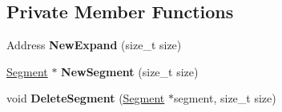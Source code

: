 \subsection*{Private Member Functions}
\begin{DoxyCompactItemize}
\item 
Address {\bfseries New\+Expand} (size\+\_\+t size)\hypertarget{classv8_1_1internal_1_1_zone_ac552c31c7a8cf5807ae9a3843d78f207}{}\label{classv8_1_1internal_1_1_zone_ac552c31c7a8cf5807ae9a3843d78f207}

\item 
\hyperlink{classv8_1_1internal_1_1_segment}{Segment} $\ast$ {\bfseries New\+Segment} (size\+\_\+t size)\hypertarget{classv8_1_1internal_1_1_zone_ad063ab9691aa305ae4645c9dec62a547}{}\label{classv8_1_1internal_1_1_zone_ad063ab9691aa305ae4645c9dec62a547}

\item 
void {\bfseries Delete\+Segment} (\hyperlink{classv8_1_1internal_1_1_segment}{Segment} $\ast$segment, size\+\_\+t size)\hypertarget{classv8_1_1internal_1_1_zone_abe4e20dd73e74f4baa2620fdd71cfca8}{}\label{classv8_1_1internal_1_1_zone_abe4e20dd73e74f4baa2620fdd71cfca8}

\end{DoxyCompactItemize}
